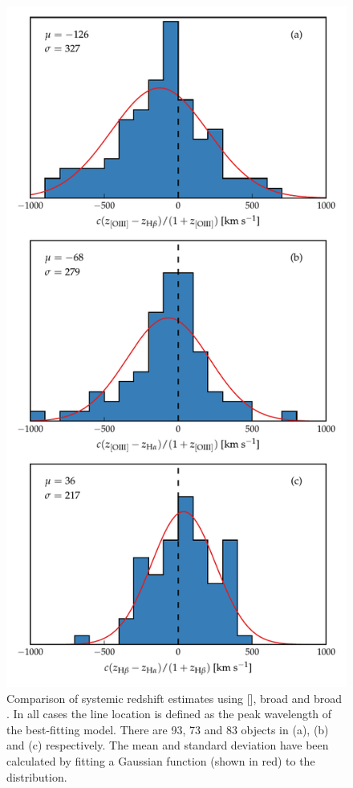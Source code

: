 \begin{figure}
    \centering
    \includegraphics[width=0.8\linewidth]{figures/chapter04/redshift_comparison.pdf} 
    \caption{Comparison of systemic redshift estimates using [], broad \hb and broad \hans. In all cases the line location is defined as the peak wavelength of the best-fitting model. There are 93, 73 and 83 objects in (a), (b) and (c) respectively. The mean and standard deviation have been calculated by fitting a Gaussian function (shown in red) to the distribution.   }       
    \label{fig:redshift_comparison}
\end{figure}

